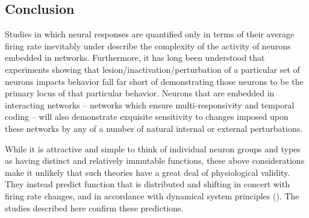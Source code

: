 \begin{refsection}
\section{Conclusion}
Studies in which neural responses are quantified only in terms of their average firing rate inevitably under describe the complexity of the activity of neurons embedded in networks. Furthermore, it has long been understood that experiments showing that lesion/inactivation/perturbation of a particular set of neurons impacts behavior fall far short of demonstrating those neurons to be the primary locus of that particular behavior. Neurons that are embedded in interacting networks – networks which ensure multi-responsivity and temporal coding – will also demonstrate exquisite sensitivity to changes imposed upon these networks by any of a number of natural internal or external perturbations.

While it is attractive and simple to think of individual neuron groups and types as having distinct and relatively immutable functions, these above considerations make it unlikely that such theories have a great deal of physiological validity. They instead predict function that is distributed and shifting in concert with firing rate changes, and in accordance with dynamical system principles (\cite{jones2006a,camera2019a,miller2016a}). The studies described here confirm these predictions.

\begin{singlespace}
\printbibliography[title={References}]
\end{singlespace}

\end{refsection}